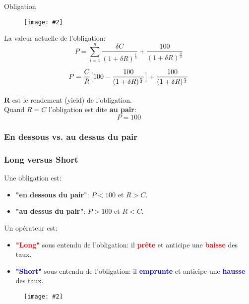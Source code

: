 \documentclass{beamer}
\newcommand{\FIG}[2]{\texttt{[image: \#2]}}
\begin{document}
\begin{frame}{Obligation}
\begin{center}
\begin{figure}
\FIG{9cm}{figures/bond.png}
\end{figure}
\end{center}
\begin{overprint}
La valeur actuelle de l'obligation:\\
\[
P=\sum_{i=1}^{n} \frac{\delta C}{(1+\delta R)^{\frac{i}{\delta}}}+\frac{100}{(1+\delta R)^{\frac{n}{\delta}}}
\]
\[
P=\vphantom{\sum_{i=1}^{n}}\frac{C}{R}\big[100-\frac{100}{(1+\delta R)^{\frac{n}{\delta}}}\big]+\frac{100}{(1+\delta R)^{\frac{n}{\delta}}}
\]
\end{overprint}
\vspace{0.5cm}
$\mathbf{R}$ est le rendement (yield) de l'obligation.\\
\vspace{0.5cm} 
Quand $R=C$ l'obligation est dite \textbf{au pair}:
\[
P=100
\]
\end{frame}
\begin{frame}
\frametitle<1-4>{En dessous vs. au dessus du pair}
\frametitle<5-7>{Long versus Short}
\begin{overprint}
Une obligation est:
\begin{itemize}
\item<3-4>\textbf{"en dessous du pair"}: $P<100$ et $R>C$.
\item<4>\textbf{"au dessus du pair"}: $P>100$ et $R<C$.
\end{itemize}
Un opérateur est:
\begin{itemize}
\item<6-7>\textcolor{red}{\textbf{"Long"}} sous entendu de l'obligation: il \textcolor{red}{\textbf{prête}} et anticipe une \textcolor{red}{\textbf{baisse}} des taux.
\item<7>\textcolor{blue}{\textbf{"Short"}} sous entendu de l'obligation: il \textcolor{blue}{\textbf{emprunte}} et anticipe une \textcolor{blue}{\textbf{hausse}} des taux.
\end{itemize}
\end{overprint}
\begin{center}
\begin{figure}
\FIG{4.5cm}{figures/prixvsrdt.png}
\end{figure}
\end{center}
\end{frame}
\end{document}
